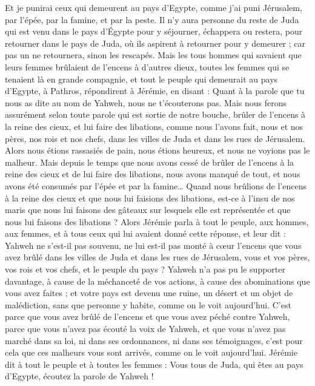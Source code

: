 \begin{multicols}{2}
Et je punirai ceux qui demeurent au pays d'Egypte, comme j'ai puni Jérusalem, par l'épée, par la famine, et par la peste.
Il n'y aura personne du reste de Juda qui est venu dans le pays d’Égypte pour y séjourner, échappera ou restera, pour retourner dans le pays de Juda, où ils aspirent à retourner pour y demeurer ; car pas un ne retournera, sinon les rescapés.
Mais les tous hommes qui savaient que leurs femmes brûlaient de l'encens à d'autres dieux, toutes les femmes qui se tenaient là en grande compagnie, et tout le peuple qui demeurait au pays d'Egypte, à Pathros, répondirent à Jérémie, en disant :
Quant à la parole que tu nous as dite au nom de Yahweh, nous ne t'écouterons pas.
Mais nous ferons assurément selon toute parole qui est sortie de notre bouche, brûler de l'encens à la reine des cieux, et lui faire des libations, comme nous l'avons fait, nous et nos pères, nos rois et nos chefs, dans les villes de Juda et dans les rues de Jérusalem. Alors nous étions rassasiés de pain, nous étions heureux, et nous ne voyions pas le malheur.
Mais depuis le temps que nous avons cessé de brûler de l'encens à la reine des cieux et de lui faire des libations, nous avons manqué de tout, et nous avons été consumés par l'épée et par la famine…
Quand nous brûlions de l'encens à la reine des cieux et que nous lui faisions des libations, est-ce à l'insu de nos maris que nous lui faisons des gâteaux sur lesquels elle est représentée et que nous lui faisons des libations ?
Alors Jérémie parla à tout le peuple, aux hommes, aux femmes, et à tous ceux qui lui avaient donné cette réponse, et leur dit :
Yahweh ne s'est-il pas souvenu, ne lui est-il pas monté à cœur l'encens que vous avez brûlé dans les villes de Juda et dans les rues de Jérusalem, vous et vos pères, vos rois et vos chefs, et le peuple du pays ?
Yahweh n'a pas pu le supporter davantage, à cause de la méchanceté de vos actions, à cause des abominations que vous avez faites ; et votre pays est devenu une ruine, un désert et un objet de malédiction, sans que personne y habite, comme on le voit aujourd'hui.
C'est parce que vous avez brûlé de l'encens et que vous avez péché contre Yahweh, parce que vous n'avez pas écouté la voix de Yahweh, et que vous n'avez pas marché dans sa loi, ni dans ses ordonnances, ni dans ses témoignages, c'est pour cela que ces malheurs vous sont arrivés, comme on le voit aujourd'hui.
Jérémie dit à tout le peuple et à toutes les femmes : Vous tous de Juda, qui êtes au pays d'Egypte, écoutez la parole de Yahweh !

\end{multicols}
